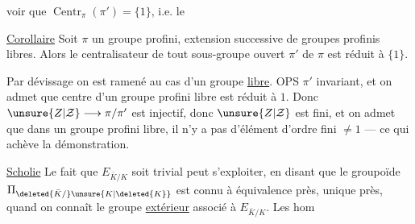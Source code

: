 voir que $\operatorname{Centr}_{\pi}(\pi')=\{1\}$, i.e. le

\uline{Corollaire} Soit $\pi$ un groupe profini, extension successive de groupes profinis libres. Alors le centralisateur  de tout sous-groupe ouvert $\pi'$ de $\pi$ est réduit à $\{1\}$.

Par dévissage on est ramené au cas d'un groupe  \uline{libre}.  OPS $\pi'$ invariant, et on admet que  centre d'un groupe profini libre est réduit à $1$.
Donc $\unsure{Z|\mathcal Z}\longrightarrow\pi/\pi'$ est injectif, donc $\unsure{Z|\mathcal Z}$ est fini, et on admet que dans un groupe profini libre, il n'y a pas d'élément d'ordre fini $\neq1$  --- ce qui achève la démonstration.

\uline{Scholie} Le fait que $E_{\bar K/K}$ soit   trivial peut s'exploiter, en disant que le groupoïde $\Pi_{\deleted{\bar K/}\unsure{K|\deleted{K}}}$  est connu à équivalence près,  unique près, quand on connaît le groupe \uline{extérieur} associé à $E_{\bar K/K}$. Les hom
